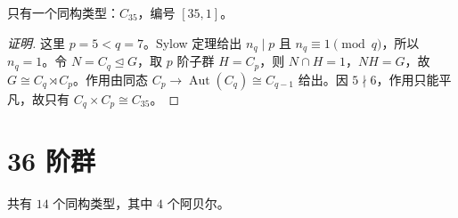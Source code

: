 \documentclass[UTF8,fontset=fandol,11pt,a4paper]{ctexart}
\newcommand{\Aut}{\operatorname{Aut}}\newcommand{\GL}{\operatorname{GL}}\newcommand{\ord}{\operatorname{ord}}\newcommand{\Z}{\mathrm Z}
\begin{document}
只有一个同构类型：$C_{35}$，编号 $[35,1]$。

\begin{proof}[证明]
这里 $p=5<q=7$。Sylow 定理给出 $n_q\mid p$ 且 $n_q\equiv1\pmod q$，所以 $n_q=1$。令 $N=C_q\trianglelefteq G$，取 $p$ 阶子群 $H=C_p$，则 $N\cap H=1$，$NH=G$，故 $G\cong C_q\rtimes C_p$。作用由同态 $C_p\to\Aut(C_q)\cong C_{q-1}$ 给出。因 $5\nmid 6$，作用只能平凡，故只有 $C_q\times C_p\cong C_{35}$。
\end{proof}

\section*{36 阶群}\label{order:36}

共有 $14$ 个同构类型，其中 $4$ 个阿贝尔。

\begingroup\small\setlength{\tabcolsep}{3pt}\renewcommand{\arraystretch}{1.12}
\end{document}
